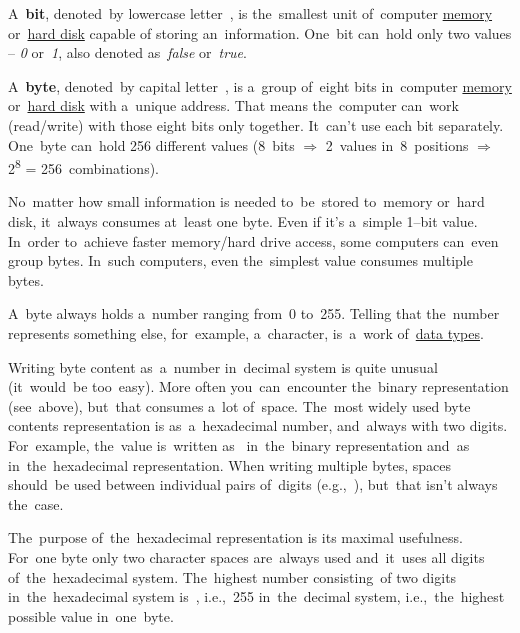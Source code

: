 \label{bitsbytes}
A~\textbf{bit}, denoted~by lowercase letter~, is the~smallest unit of~computer \hyperref[systemmemory]{memory} or~\hyperref[harddiskdrive]{hard disk} capable of storing an~information.
One~bit can~hold only two values -- \textit{0} or~\textit{1}, also denoted as~\textit{false} or~\textit{true}.

A~\textbf{byte}, denoted~by capital letter~, is a~group of~eight bits in~computer \hyperref[systemmemory]{memory} or~\hyperref[harddiskdrive]{hard disk} with a~unique address.
That means the~computer can~work (read/write) with those eight bits only together.
It~can't use each bit separately.
One~byte can~hold 256 different values (8~bits $\Rightarrow$ 2~values in~8~positions $\Rightarrow$ 2\textsuperscript{8} = 256~combinations).

No~matter how small information is needed to~be~stored to~memory or~hard disk, it~always consumes at~least one byte.
Even if it's a~simple \mbox{1--bit}  value.
In~order to~achieve faster memory/hard drive access, some computers can~even group bytes.
In~such computers, even the~simplest  value consumes multiple bytes.

\enlargethispage{20mm}
\thispagestyle{empty}
A~byte always holds a~number ranging from~0 to~255.
Telling that the~number represents something else, for~example, a~character, is~a~work of~\hyperref[datatypes]{data types}.

Writing byte content as~a~number in~decimal system is quite unusual (it~would~be too~easy).
More often you~can~encounter the~binary representation (see~above), but~that consumes a~lot of~space.
The~most widely used byte contents representation is as~a~hexadecimal number, and~always with two digits.
For~example, the~value  is~written as~ in~the~binary representation and~as~ in~the~hexadecimal representation.
When writing multiple bytes, spaces should~be used between individual pairs of~digits (e.g.,~), but~that isn't always the~case.

The~purpose of~the~hexadecimal representation is its maximal usefulness.
For~one byte only two character spaces are~always used and~it~uses all digits of~the~hexadecimal system.
The~highest number consisting~of two digits in~the~hexadecimal system is~, i.e.,~255 in~the~decimal system, i.e.,~the~highest possible value in~one~byte.
\newpage

